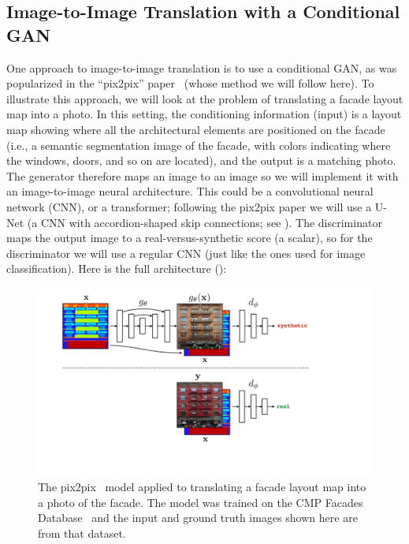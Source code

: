 \subsection{Image-to-Image Translation with a Conditional GAN}  One approach to image-to-image translation is to use a conditional GAN, as was popularized in the ``pix2pix'' paper~\cite{pix2pix2017} (whose method we will follow here). To illustrate this approach, we will look at the problem of translating a facade layout map into a photo. In this setting, the conditioning information (input) is a layout map showing where all the architectural elements are positioned on the facade (i.e., a semantic segmentation image of the facade, with colors indicating where the windows, doors, and so on are located), and the output is a matching photo. The generator therefore maps an image to an image so we will implement it with an image-to-image neural architecture. This could be a convolutional neural network (CNN), or a transformer; following the pix2pix paper we will use a U-Net (a CNN with accordion-shaped skip connections; see \sect{\ref{sec:convolutional_neural_nets:unet}}). The discriminator maps the output image to a real-versus-synthetic score (a scalar), so for the discriminator we will use a regular CNN (just like the ones used for image classification). Here is the full architecture (\fig{\ref{fig:conditional_generative_models:pix2pix_facades_arch}}):
\begin{figure}[h!]
    \centerline{
        \includegraphics[width=0.9\linewidth]{./figures/conditional_generative_models/pix2pix_facades_arch.pdf}
    }
    \caption{The pix2pix~\cite{pix2pix2017} model applied to translating a facade layout map into a photo of the facade. The model was trained on the CMP Facades Database~\cite{Tylecek13} and the input and ground truth images shown here are from that dataset.}
    \label{fig:conditional_generative_models:pix2pix_facades_arch}
\end{figure}


